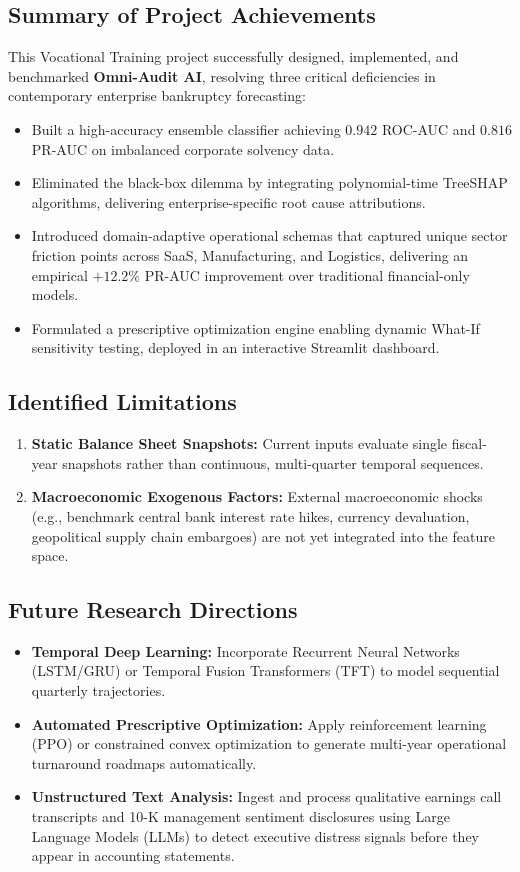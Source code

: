 \documentclass[11pt, a4paper]{article}
\begin{document}
\subsection{Summary of Project Achievements}
This Vocational Training project successfully designed, implemented, and benchmarked \textbf{Omni-Audit AI}, resolving three critical deficiencies in contemporary enterprise bankruptcy forecasting:
\begin{itemize}
    \item Built a high-accuracy ensemble classifier achieving $0.942$ ROC-AUC and $0.816$ PR-AUC on imbalanced corporate solvency data.
    \item Eliminated the black-box dilemma by integrating polynomial-time TreeSHAP algorithms, delivering enterprise-specific root cause attributions.
    \item Introduced domain-adaptive operational schemas that captured unique sector friction points across SaaS, Manufacturing, and Logistics, delivering an empirical $+12.2\%$ PR-AUC improvement over traditional financial-only models.
    \item Formulated a prescriptive optimization engine enabling dynamic What-If sensitivity testing, deployed in an interactive Streamlit dashboard.
\end{itemize}

\subsection{Identified Limitations}
\begin{enumerate}
    \item \textbf{Static Balance Sheet Snapshots:} Current inputs evaluate single fiscal-year snapshots rather than continuous, multi-quarter temporal sequences.
    \item \textbf{Macroeconomic Exogenous Factors:} External macroeconomic shocks (e.g., benchmark central bank interest rate hikes, currency devaluation, geopolitical supply chain embargoes) are not yet integrated into the feature space.
\end{enumerate}

\subsection{Future Research Directions}
\begin{itemize}
    \item \textbf{Temporal Deep Learning:} Incorporate Recurrent Neural Networks (LSTM/GRU) or Temporal Fusion Transformers (TFT) to model sequential quarterly trajectories.
    \item \textbf{Automated Prescriptive Optimization:} Apply reinforcement learning (PPO) or constrained convex optimization to generate multi-year operational turnaround roadmaps automatically.
    \item \textbf{Unstructured Text Analysis:} Ingest and process qualitative earnings call transcripts and 10-K management sentiment disclosures using Large Language Models (LLMs) to detect executive distress signals before they appear in accounting statements.
\end{itemize}
\end{document}
